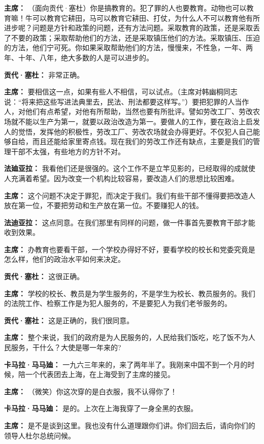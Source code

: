 \begin{list}{}
\item[\textbf{主席：}] （面向贡代·塞杜）你是搞教育的。犯了罪的人也要教育。动物也可以教育嘛！牛可以教育它耕田，马可以教育它耕田、打仗，为什么人不可以教育他有所进步呢？问题是方针和政策的问题，还有方法问题。采取教育的政策，还是采取丢了不要的政策；采取帮助他们的方法，还是采取镇压他们的方法。采取镇压、压迫的方法，他们宁可死。你如果采取帮助他们的方法，慢慢来，不性急，一年、两年、十年、八年，绝大多数的人是可以进步的。

\item[\textbf{贡代·塞杜：}] 非常正确。

\item[\textbf{主席：}] 要相信这一点，如果有些人不相信，可以试点。（主席对韩幽桐同志说：“将来把这些写进法典里去，民法、刑法都要这样写。”）要把犯罪的人当作人，对他们有点希望，对他有所帮助，当然也要有所批评。譬如劳改工厂、劳改农场就不能以生产为第一，就要以政治改造为第一。要做人的工作，要在政治上启发人的觉悟，发挥他的积极性，劳改工厂、劳改农场就会办得更好。不仅犯人自己能够自给，而且还能给家里寄点钱。现在我们的劳改工作还有缺点，主要是我们的管理干部不太强，有些地方的方针不对。

\item[\textbf{法廸亚拉：}] 我看他们还是很强的。这个工作不是立竿见影的，已经取得的成就使人充满着希望。因为改变一个机构比较容易，要改造人们的思想比较困难。

\item[\textbf{主席：}] 这个问题不决定于罪犯，而决定于我们。我们有些干部不懂得要把改造人放在第一位，不要把劳动和生产放在第一位。不要赚犯人的钱。

\item[\textbf{法迪亚拉：}] 这点同意。在我们那里有同样的问题，做一件事首先要教育干部才能收到效果。

\item[\textbf{主席：}] 办教育也要看干部，一个学校办得好不好，要看学校的校长和党委究竟是怎么样，他们的政治水平如何来决定。

\item[\textbf{贡代·塞杜：}] 这很正确。

\item[\textbf{主席：}] 学校的校长、教员是为学生服务的，不是学生为校长、教员服务的。我们的法院工作、检察工作是为犯人服务的，不是要犯人为我们老爷服务的。

\item[\textbf{贡代·塞社：}] 这是正确的，我们很同意。

\item[\textbf{主席：}] 整个来说，我们的政府是为人民服务的，人民给我们饭吃，吃了饭不为人民服务，干什么？大使是哪一年来的?

\item[\textbf{卡马拉·马马廸：}] 一九六三年来的，来了两年半了。我刚来中国不到一个月的时候，陪一个代表团去上海，在上海受到了主席的接见。

\item[\textbf{主席：}] （微笑）你这次穿的是白衣服，我不认得你了！

\item[\textbf{卡马拉·马马廸：}] 是的。上次在上海我穿了一身全黑的衣服。

\item[\textbf{主席：}] 是不是谈到这里。我也没有什么道理跟你们讲。你们回去后，请向你们的领导人杜尔总统问候。
\end{list}

